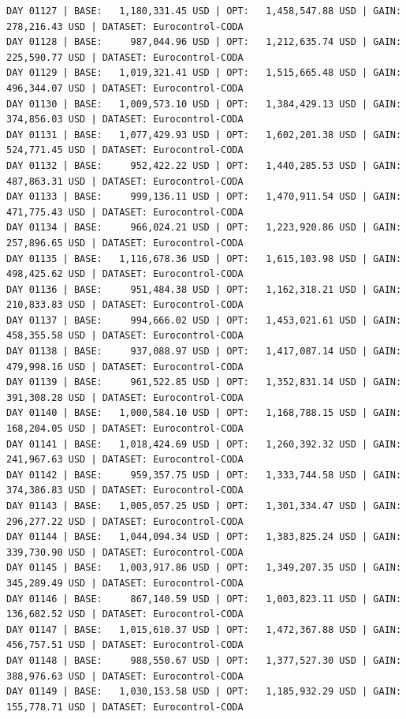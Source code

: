 \documentclass[11pt,a4paper]{article}
\begin{document}
\begin{verbatim}
DAY 01127 | BASE:   1,180,331.45 USD | OPT:   1,458,547.88 USD | GAIN: 278,216.43 USD | DATASET: Eurocontrol-CODA
DAY 01128 | BASE:     987,044.96 USD | OPT:   1,212,635.74 USD | GAIN: 225,590.77 USD | DATASET: Eurocontrol-CODA
DAY 01129 | BASE:   1,019,321.41 USD | OPT:   1,515,665.48 USD | GAIN: 496,344.07 USD | DATASET: Eurocontrol-CODA
DAY 01130 | BASE:   1,009,573.10 USD | OPT:   1,384,429.13 USD | GAIN: 374,856.03 USD | DATASET: Eurocontrol-CODA
DAY 01131 | BASE:   1,077,429.93 USD | OPT:   1,602,201.38 USD | GAIN: 524,771.45 USD | DATASET: Eurocontrol-CODA
DAY 01132 | BASE:     952,422.22 USD | OPT:   1,440,285.53 USD | GAIN: 487,863.31 USD | DATASET: Eurocontrol-CODA
DAY 01133 | BASE:     999,136.11 USD | OPT:   1,470,911.54 USD | GAIN: 471,775.43 USD | DATASET: Eurocontrol-CODA
DAY 01134 | BASE:     966,024.21 USD | OPT:   1,223,920.86 USD | GAIN: 257,896.65 USD | DATASET: Eurocontrol-CODA
DAY 01135 | BASE:   1,116,678.36 USD | OPT:   1,615,103.98 USD | GAIN: 498,425.62 USD | DATASET: Eurocontrol-CODA
DAY 01136 | BASE:     951,484.38 USD | OPT:   1,162,318.21 USD | GAIN: 210,833.83 USD | DATASET: Eurocontrol-CODA
DAY 01137 | BASE:     994,666.02 USD | OPT:   1,453,021.61 USD | GAIN: 458,355.58 USD | DATASET: Eurocontrol-CODA
DAY 01138 | BASE:     937,088.97 USD | OPT:   1,417,087.14 USD | GAIN: 479,998.16 USD | DATASET: Eurocontrol-CODA
DAY 01139 | BASE:     961,522.85 USD | OPT:   1,352,831.14 USD | GAIN: 391,308.28 USD | DATASET: Eurocontrol-CODA
DAY 01140 | BASE:   1,000,584.10 USD | OPT:   1,168,788.15 USD | GAIN: 168,204.05 USD | DATASET: Eurocontrol-CODA
DAY 01141 | BASE:   1,018,424.69 USD | OPT:   1,260,392.32 USD | GAIN: 241,967.63 USD | DATASET: Eurocontrol-CODA
DAY 01142 | BASE:     959,357.75 USD | OPT:   1,333,744.58 USD | GAIN: 374,386.83 USD | DATASET: Eurocontrol-CODA
DAY 01143 | BASE:   1,005,057.25 USD | OPT:   1,301,334.47 USD | GAIN: 296,277.22 USD | DATASET: Eurocontrol-CODA
DAY 01144 | BASE:   1,044,094.34 USD | OPT:   1,383,825.24 USD | GAIN: 339,730.90 USD | DATASET: Eurocontrol-CODA
DAY 01145 | BASE:   1,003,917.86 USD | OPT:   1,349,207.35 USD | GAIN: 345,289.49 USD | DATASET: Eurocontrol-CODA
DAY 01146 | BASE:     867,140.59 USD | OPT:   1,003,823.11 USD | GAIN: 136,682.52 USD | DATASET: Eurocontrol-CODA
DAY 01147 | BASE:   1,015,610.37 USD | OPT:   1,472,367.88 USD | GAIN: 456,757.51 USD | DATASET: Eurocontrol-CODA
DAY 01148 | BASE:     988,550.67 USD | OPT:   1,377,527.30 USD | GAIN: 388,976.63 USD | DATASET: Eurocontrol-CODA
DAY 01149 | BASE:   1,030,153.58 USD | OPT:   1,185,932.29 USD | GAIN: 155,778.71 USD | DATASET: Eurocontrol-CODA

\end{verbatim}
\end{document}
